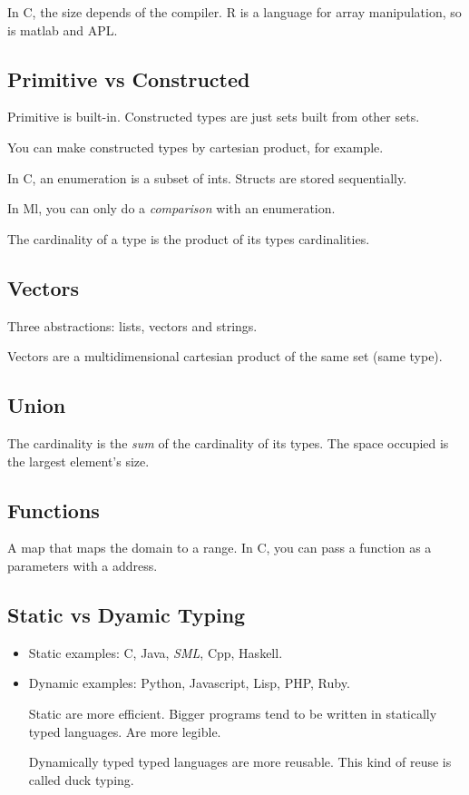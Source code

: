 \documentclass[11pt]{article}
\begin{document}
In C, the size depends of the compiler. R is a language for array manipulation, so is
matlab and APL.


\subsection{Primitive vs Constructed}
\label{sec:orga302818}
Primitive is built-in. Constructed types are just sets built from other sets.

You can make constructed types by cartesian product, for example.

In C, an enumeration is a subset of ints. Structs are stored sequentially.

In Ml, you can only do a \emph{comparison} with an enumeration.

The cardinality of a type is the product of its types cardinalities.

\subsection{Vectors}
\label{sec:org683b7a9}
Three abstractions: lists, vectors and strings.

Vectors are a multidimensional cartesian product of the same set (same type).

\subsection{Union}
\label{sec:orgeebe156}
The cardinality is the \emph{sum} of the cardinality of its types. The space occupied is the
largest element's size.
\subsection{Functions}
\label{sec:org2555943}
A map that maps the domain to a range. In C, you can pass a function as a parameters
with a address.
\subsection{Static vs Dyamic Typing}
\label{sec:org9ad9013}
\begin{itemize}
\item Static examples: C, Java, \emph{SML}, Cpp, Haskell.
\item Dynamic examples: Python, Javascript, Lisp, PHP, Ruby.

Static are more efficient. Bigger programs tend to be written in statically typed
languages. Are more legible.

Dynamically typed typed languages are more reusable. This kind of reuse is called
duck typing.
\end{itemize}
\end{document}
